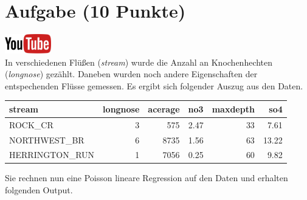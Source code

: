 \documentclass[a4paper, 10pt]{scrartcl}\usepackage[]{graphicx}\usepackage[]{xcolor}
\newenvironment{knitrout}{}{} %
\begin{document}
\clearpage

\section{Aufgabe \hfill (10 Punkte)}

\hfill\href{https://youtu.be/K_28Ne6ladI}{\includegraphics[width =
  2cm]{img/youtube}}\\[1Ex]




In verschiedenen Fl{\"u}{\ss}en (\textit{stream}) wurde die Anzahl an
Knochenhechten (\textit{longnose}) gez{\"a}hlt. Daneben wurden noch andere
Eigenschaften der entspechenden Fl{\"u}sse gemessen. Es ergibt sich folgender
Auszug aus den Daten. 


\begin{knitrout}
\color{fgcolor}\begin{table}[!h]
\centering
\begin{tabular}{lrrrrr}
\toprule
stream & longnose & acerage & no3 & maxdepth & so4\\
\midrule
ROCK\_CR & 3 & 575 & 2.47 & 33 & 7.61\\
NORTHWEST\_BR & 6 & 8735 & 1.56 & 63 & 13.22\\
HERRINGTON\_RUN & 1 & 7056 & 0.25 & 60 & 9.82\\
\bottomrule
\end{tabular}
\end{table}

\end{knitrout}


Sie rechnen nun eine Poisson lineare Regression auf den Daten und erhalten
folgenden \Rlogo Output.
\end{document}
